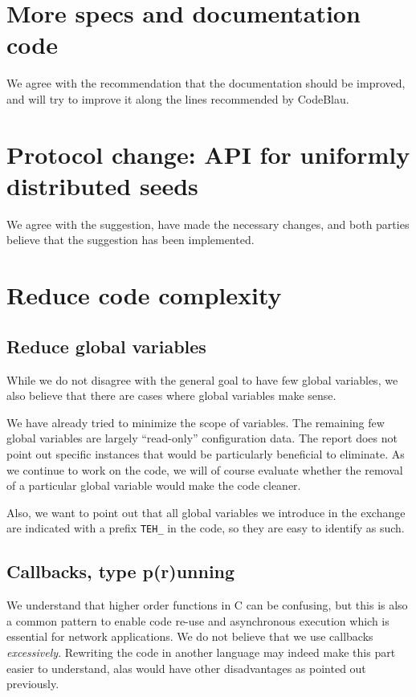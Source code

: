 \documentclass[11pt]{article}
\begin{document}
\section{More specs and documentation code}

We agree with the recommendation that the documentation should be improved,
and will try to improve it along the lines recommended by CodeBlau.

\section{Protocol change: API for uniformly distributed seeds}

We agree with the suggestion, have made the necessary changes, and both
parties believe that the suggestion has been implemented.

\section{Reduce code complexity}

\subsection{Reduce global variables}

While we do not disagree with the general goal to have few global variables,
we also believe that there are cases where global variables make sense.

We have already tried to minimize the scope of variables. The remaining few
global variables are largely ``read-only'' configuration data. The report does
not point out specific instances that would be particularly beneficial to
eliminate. As we continue to work on the code, we will of course evaluate
whether the removal of a particular global variable would make the code
cleaner.

Also, we want to point out that all global variables we introduce
in the exchange are indicated with a prefix {\tt TEH\_} in the code, so they
are easy to identify as such.

\subsection{Callbacks, type p(r)unning}

We understand that higher order functions in C can be confusing, but this
is also a common pattern to enable code re-use and asynchronous execution
which is essential for network applications. We do not believe that we
use callbacks {\em excessively}.  Rewriting the code in another language
may indeed make this part easier to understand, alas would have other
disadvantages as pointed out previously.
\end{document}

